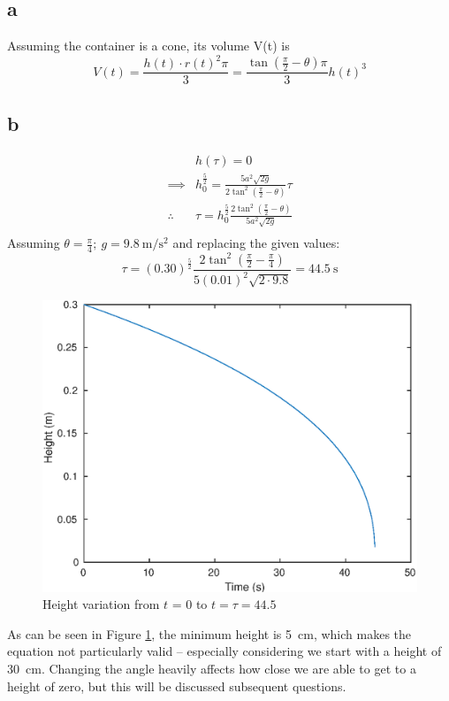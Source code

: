 \subsection{a}
Assuming the container is a cone, its volume V(t) is \begin{equation} \label{eq:V}
    V(t) = \frac{h(t) \cdot {r(t)}^2 \pi}{3} = \frac{ \tan\left( \frac{\pi}{2} - \theta \right) \pi}{3}{h(t)}^3 
\end{equation}

\subsection{b}
\begin{equation}
\begin{split}
    &h(\tau) = 0 \\
    \implies &h_0^{\frac{5}{2}} = \frac{ 5a^2 \sqrt{2g} }{ 2\tan^2\left(\frac{\pi}{2} - \theta\right) } \tau \\
    \therefore \ &\tau = h_0^{\frac{5}{2}} \frac{ 2\tan^2\left(\frac{\pi}{2} - \theta\right) }{ 5a^2 \sqrt{2g} }\\
\end{split}
\label{eq:tau}
\end{equation}
Assuming $\theta = \frac{\pi}{4}; \ g=\SI{9.8}{\meter\per\second\squared}$ and replacing the given values:
\begin{equation}
    \tau = {(0.30)}^{\frac{5}{2}} \frac{2 \tan^2\left(\frac{\pi}{2} - \frac{\pi}{4} \right)}{ 5{(0.01)}^2 \sqrt{2\cdot 9.8} }
    = \SI{44.5}{\second}
\end{equation}
\begin{figure}[h]
	\includegraphics[scale=0.65, center]{./eps/topic5_b.eps}
	\caption{Height variation from $t$ = 0 to $t=\tau=44.5$ }
	\label{fig:Topic5-b}
\end{figure}
As can be seen in Figure \ref{fig:Topic5-b}, the minimum height is \SI{5}{\centi\meter}, which makes the equation not particularly valid -- especially considering we start with a height of \SI{30}{\centi\meter}.
Changing the angle heavily affects how close we are able to get to a height of zero, but this will be discussed subsequent questions.


